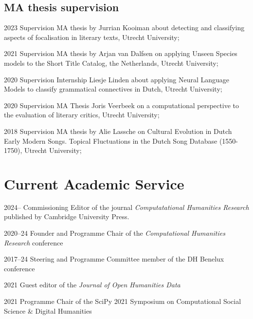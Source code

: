 \documentclass[12pt,letterpaper]{report}
\begin{document}
\subsection*{MA thesis supervision}  
\begin{tablist}
  \item[2023] \tab{}Supervision MA thesis by Jurrian Kooiman about detecting and
    classifying aspects of focalisation in literary texts, Utrecht University;
  \item[2021] \tab{}Supervision MA thesis by Arjan van Dalfsen on applying
    Unseen Species models to the Short Title Catalog, the Netherlands, Utrecht University;
  \item[2020] \tab{}Supervision Internship Liesje Linden about applying Neural Language
    Models to classify grammatical connectives in Dutch, Utrecht University;
  \item[2020] \tab{}Supervision MA Thesis Joris Veerbeek on a computational perspective to
    the evaluation of literary critics, Utrecht University;
  \item[2018] \tab{} Supervision MA thesis by Alie Lassche on Cultural Evolution
    in Dutch Early Modern Songs. Topical Fluctuations in the Dutch Song Database
    (1550-1750), Utrecht University;
\end{tablist}

\section*{Current Academic Service}
\begin{tablist}
\item[2024--] \tab{}Commissioning Editor of the journal \emph{Computatational
    Humanities Research} published by Cambridge University Press.
\item[2020--24] \tab{}Founder and Programme Chair of the \textit{Computational
    Humanities Research} conference
\item[2017--24] \tab{}Steering and Programme Committee member of the DH Benelux
  conference
\item[2021] \tab{}Guest editor of the \textit{Journal of Open Humanities Data}
\item[2021] \tab{}Programme Chair of the SciPy 2021 Symposium on Computational
  Social Science \& Digital Humanities
\end{tablist}
\end{document}
